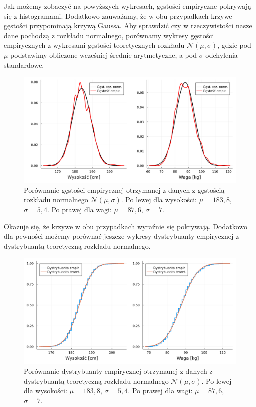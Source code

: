 \documentclass[12pt]{mwart}
\begin{document}
	\noindent Jak możemy zobaczyć na powyższych wykresach, gęstości empiryczne pokrywają się z histogramami. Dodatkowo zauważamy, że w obu przypadkach krzywe gęstości przypominają krzywą Gaussa. Aby sprawdzić czy w rzeczywistości nasze dane pochodzą z rozkładu normalnego, porównamy wykresy gęstości empirycznych z wykresami gęstości teoretycznych rozkładu $\mathcal{N}(\mu, \sigma)$, gdzie pod $\mu$ podstawimy obliczone wcześniej średnie arytmetyczne, a pod $\sigma$ odchylenia standardowe.
	
	\begin{figure}[H]
		\includegraphics[scale=0.1]{images/normal.png}
		\caption{Porównanie gęstości empirycznej otrzymanej z danych z gęstością rozkładu normalnego $\mathcal{N}(\mu, \sigma)$. Po lewej dla wysokości: $\mu=183,8$, $\sigma=5,4$. Po prawej dla wagi: $\mu=87,6$, $\sigma=7$.}
	\end{figure}
	
	\noindent Okazuje się, że krzywe w obu przypadkach wyraźnie się pokrywają. Dodatkowo dla pewności możemy porównać jeszcze wykresy dystrybuanty empirycznej z dystrybuantą teoretyczną rozkładu normalnego.
	
	\begin{figure}[H]
		\centering
		\includegraphics[scale=0.1]{images/ecdf.png}
		\caption{Porównanie dystrybuanty empirycznej otrzymanej z danych z dystrybuantą teoretyczną rozkładu normalnego $\mathcal{N}(\mu, \sigma)$. Po lewej dla wysokości: $\mu=183,8$, $\sigma=5,4$. Po prawej dla wagi: $\mu=87,6$, $\sigma=7$.}
	\end{figure}
\end{document}
